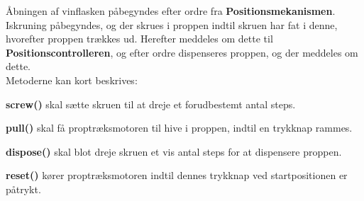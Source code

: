 \noindent Åbningen af vinflasken påbegyndes efter ordre fra \textbf{Positionsmekanismen}. Iskruning påbegyndes, og der skrues i proppen indtil skruen har fat i denne, hvorefter proppen trækkes ud. Herefter meddeles om dette til \textbf{Positionscontrolleren}, og efter ordre dispenseres proppen, og der meddeles om dette. \\

Metoderne kan kort beskrives:

\textbf{screw()} skal sætte skruen til at dreje et forudbestemt antal steps.

\textbf{pull()} skal få proptræksmotoren til hive i proppen, indtil en trykknap rammes.

\textbf{dispose()} skal blot dreje skruen et vis antal steps for at dispensere proppen.

\textbf{reset()} kører proptræksmotoren indtil dennes trykknap ved startpositionen er påtrykt.
